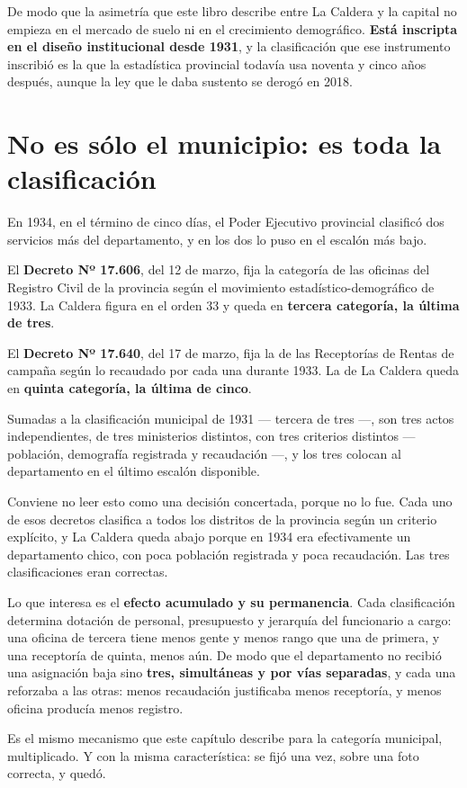 De modo que la asimetría que este libro describe entre La Caldera y la capital no empieza en
el mercado de suelo ni en el crecimiento demográfico. \textbf{Está inscripta en el diseño
institucional desde 1931}, y la clasificación que ese instrumento inscribió es la que la estadística
provincial todavía usa noventa y cinco años después, aunque la ley que le daba sustento se derogó en 2018.

\section{No es sólo el municipio: es toda la clasificación}

En 1934, en el término de cinco días, el Poder Ejecutivo provincial clasificó dos servicios
más del departamento, y en los dos lo puso en el escalón más bajo.

El \textbf{Decreto Nº 17.606}, del 12 de marzo, fija la categoría de las oficinas del
Registro Civil de la provincia según el movimiento estadístico-demográfico de 1933. La
Caldera figura en el orden 33 y queda en \textbf{tercera categoría, la última de tres}.

El \textbf{Decreto Nº 17.640}, del 17 de marzo, fija la de las Receptorías de Rentas de
campaña según lo recaudado por cada una durante 1933. La de La Caldera queda en
\textbf{quinta categoría, la última de cinco}.

Sumadas a la clasificación municipal de 1931 --- tercera de tres ---, son tres actos
independientes, de tres ministerios distintos, con tres criterios distintos --- población,
demografía registrada y recaudación ---, y los tres colocan al departamento en el último
escalón disponible.

\begin{cautela}
Conviene no leer esto como una decisión concertada, porque no lo fue. Cada uno de esos
decretos clasifica a todos los distritos de la provincia según un criterio explícito, y La
Caldera queda abajo porque en 1934 era efectivamente un departamento chico, con poca
población registrada y poca recaudación. Las tres clasificaciones eran correctas.

Lo que interesa es el \textbf{efecto acumulado y su permanencia}. Cada clasificación
determina dotación de personal, presupuesto y jerarquía del funcionario a cargo: una oficina
de tercera tiene menos gente y menos rango que una de primera, y una receptoría de quinta,
menos aún. De modo que el departamento no recibió una asignación baja sino \textbf{tres,
simultáneas y por vías separadas}, y cada una reforzaba a las otras: menos recaudación
justificaba menos receptoría, y menos oficina producía menos registro.

Es el mismo mecanismo que este capítulo describe para la categoría municipal, multiplicado.
Y con la misma característica: se fijó una vez, sobre una foto correcta, y quedó.
\end{cautela}

